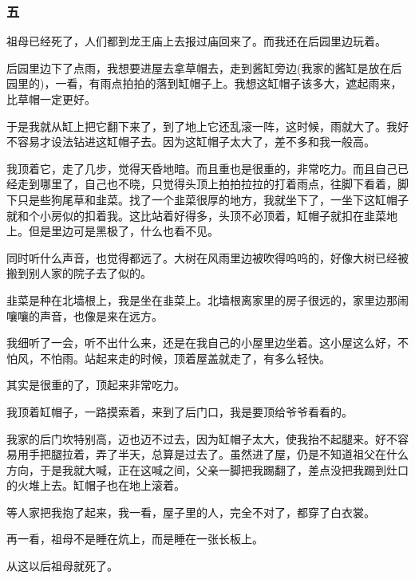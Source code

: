 \subsubsection*{五}
\par 祖母已经死了，人们都到龙王庙上去报过庙回来了。而我还在后园里边玩着。
\par 后园里边下了点雨，我想要进屋去拿草帽去，走到酱缸旁边(我家的酱缸是放在后园里的)，一看，有雨点拍拍的落到缸帽子上。我想这缸帽子该多大，遮起雨来，比草帽一定更好。
\par 于是我就从缸上把它翻下来了，到了地上它还乱滚一阵，这时候，雨就大了。我好不容易才设法钻进这缸帽子去。因为这缸帽子太大了，差不多和我一般高。
\par 我顶着它，走了几步，觉得天昏地暗。而且重也是很重的，非常吃力。而且自己已经走到哪里了，自己也不晓，只觉得头顶上拍拍拉拉的打着雨点，往脚下看着，脚下只是些狗尾草和韭菜。找了一个韭菜很厚的地方，我就坐下了，一坐下这缸帽子就和个小房似的扣着我。这比站着好得多，头顶不必顶着，缸帽子就扣在韭菜地上。但是里边可是黑极了，什么也看不见。
\par 同时听什么声音，也觉得都远了。大树在风雨里边被吹得呜呜的，好像大树已经被搬到别人家的院子去了似的。
\par 韭菜是种在北墙根上，我是坐在韭菜上。北墙根离家里的房子很远的，家里边那闹嚷嚷的声音，也像是来在远方。
\par 我细听了一会，听不出什么来，还是在我自己的小屋里边坐着。这小屋这么好，不怕风，不怕雨。站起来走的时候，顶着屋盖就走了，有多么轻快。
\par 其实是很重的了，顶起来非常吃力。
\par 我顶着缸帽子，一路摸索着，来到了后门口，我是要顶给爷爷看看的。
\par 我家的后门坎特别高，迈也迈不过去，因为缸帽子太大，使我抬不起腿来。好不容易用手把腿拉着，弄了半天，总算是过去了。虽然进了屋，仍是不知道祖父在什么方向，于是我就大喊，正在这喊之间，父亲一脚把我踢翻了，差点没把我踢到灶口的火堆上去。缸帽子也在地上滚着。
\par 等人家把我抱了起来，我一看，屋子里的人，完全不对了，都穿了白衣裳。
\par 再一看，祖母不是睡在炕上，而是睡在一张长板上。
\par 从这以后祖母就死了。
